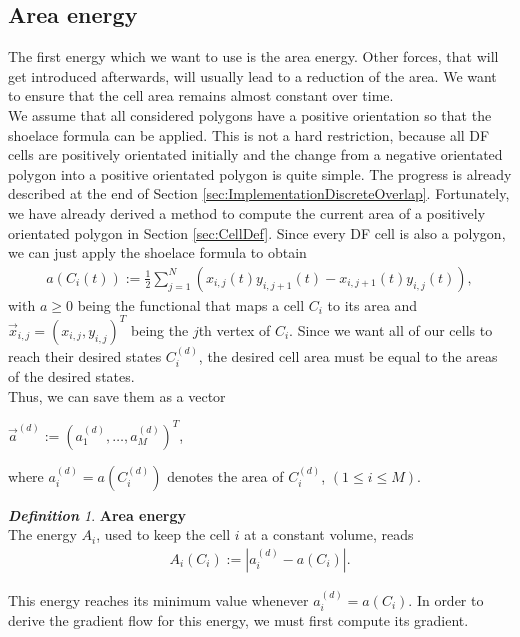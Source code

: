 \documentclass[a4paper,12pt,leqno]{article}
\theoremstyle{plain}
\theoremstyle{remark}
\newtheorem{definition}[theorem]{\bf Definition}
\begin{document}
\subsection{Area energy}
The first energy which we want to use is the area energy.
Other forces, that will get introduced afterwards, will usually lead to a reduction of the area. 
We want to ensure that the cell area remains almost constant over time. \\
We assume that all considered polygons have a positive orientation so that the shoelace formula can be applied. This is not a hard restriction, because all DF cells are positively orientated initially and the change from a negative orientated polygon into a positive orientated polygon is quite simple. The progress is already described at the end of Section \ref{sec:ImplementationDiscreteOverlap}. 
Fortunately, we have already derived a method to compute the current area of a positively orientated polygon in Section \ref{sec:CellDef}. Since every DF cell is also a polygon, we can just apply the shoelace formula to obtain
\begin{align}
	a(C_i(t)) :=  \frac{1}{2}\sum\limits_{j = 1}^{N} (x_{i,j}(t) y_{i,j+1}(t) - x_{i,j+1}(t) y_{i,j}(t)), \label{eq:areaOperator}
\end{align}
with $a \geq 0$ being the functional that maps a cell $C_i$ to its area and $\vec{x}_{i,j} = (x_{i,j}, y_{i,j})^T$ being the $j$th vertex of $C_i$.  
Since we want all of our cells to reach their desired states $C_i^{(d)}$, the desired cell area must be equal to the areas of the desired states. \\
Thus, we can save them as a vector 
\begin{center}
	$\vec{a}^{(d)} := ( a^{(d)}_1, \ldots, a^{(d)}_M )^T$, 
\end{center}
where $a^{(d)}_i = a(C_i^{(d)})$ denotes the area of  $C_i^{(d)}$, $(  1 \leq i \leq M)$. \\
\begin{definition} \textbf{Area energy} \\
	The energy $A_{i}$, used to keep the cell $i$ at a constant volume, reads 
	\begin{align}
		A_i(C_i) := | a^{(d)}_i - a(C_i) |. \label{eq:areaEnergy} 
	\end{align}
\end{definition}
This energy reaches its minimum value whenever $a^{(d)}_i = a(C_i)$. In order to derive the gradient flow for this energy, we must first compute its gradient. \\
\end{document}
